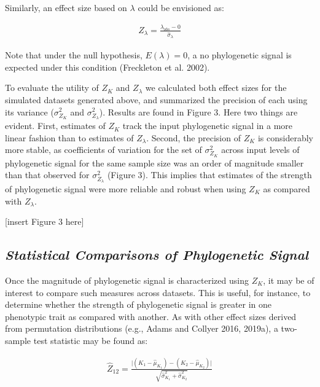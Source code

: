 \documentclass[
]{article}
\begin{document}
Similarly, an effect size based on \(\lambda\) could be envisioned as:

\begin{align}
    Z_{\lambda}=\frac{\lambda_{obs}-0}{\hat\sigma_\lambda}
\end{align}

Note that under the null hypothesis, \(E(\lambda)=0\), a no phylogenetic
signal is expected under this condition (Freckleton et al. 2002).
\hfill\break

To evaluate the utility of \(Z_K\) and \(Z_\lambda\) we calculated both
effect sizes for the simulated datasets generated above, and summarized
the precision of each using its variance (\(\sigma^2_{Z_K}\) and
\(\sigma^2_{Z_\lambda}\)). Results are found in Figure 3. Here two
things are evident. First, estimates of \(Z_K\) track the input
phylogenetic signal in a more linear fashion than to estimates of
\(Z_\lambda\). Second, the precision of \(Z_K\) is considerably more
stable, as coefficients of variation for the set of \(\sigma^2_{Z_K}\)
across input levels of phylogenetic signal for the same sample size was
an order of magnitude smaller than that observed for
\(\sigma^2_{Z_\lambda}\) (Figure 3). This implies that estimates of the
strength of phylogenetic signal were more reliable and robust when using
\(Z_K\) as compared with \(Z_\lambda\). \hfill\break

{[}insert Figure 3 here{]}

\hypertarget{statistical-comparisons-of-phylogenetic-signal}{%
\subsection{\texorpdfstring{\emph{Statistical Comparisons of
Phylogenetic
Signal}}{Statistical Comparisons of Phylogenetic Signal}}\label{statistical-comparisons-of-phylogenetic-signal}}

Once the magnitude of phylogenetic signal is characterized using
\(Z_K\), it may be of interest to compare such measures across datasets.
This is useful, for instance, to determine whether the strength of
phylogenetic signal is greater in one phenotypic trait as compared with
another. As with other effect sizes derived from permutation
distributions (e.g., Adams and Collyer 2016, 2019a), a two-sample test
statistic may be found as:

\begin{align}
  \hat{Z}_{12}=\frac{\lvert{(K_{1}-\hat\mu_{K_1})-(K_{2}-\hat\mu_{K_2})}\rvert}{\sqrt{\hat\sigma^2_{K_1}+\hat\sigma^2_{K_2}}}
\end{align}
\end{document}
